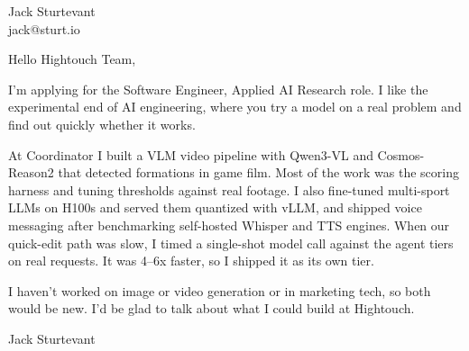 \documentclass[11pt]{article}
\begin{document}
\raggedright

{\namefont\fontsize{20pt}{24pt}\selectfont Jack Sturtevant}\\[-0.3em]
jack@sturt.io

\vspace{1.2em}

Hello Hightouch Team,

I'm applying for the Software Engineer, Applied AI Research role. I like the experimental end of AI engineering, where you try a model on a real problem and find out quickly whether it works.

At Coordinator I built a VLM video pipeline with Qwen3-VL and Cosmos-Reason2 that detected formations in game film. Most of the work was the scoring harness and tuning thresholds against real footage. I also fine-tuned multi-sport LLMs on H100s and served them quantized with vLLM, and shipped voice messaging after benchmarking self-hosted Whisper and TTS engines. When our quick-edit path was slow, I timed a single-shot model call against the agent tiers on real requests. It was 4--6x faster, so I shipped it as its own tier.

I haven't worked on image or video generation or in marketing tech, so both would be new. I'd be glad to talk about what I could build at Hightouch.

\vspace{0.6em}
Jack Sturtevant
\end{document}
